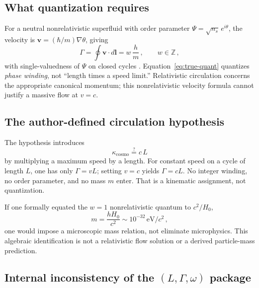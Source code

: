 \documentclass[aps,prd,reprint,superscriptaddress,nofootinbib,floatfix,showkeys]{revtex4-2}
\newcommand{\Hzero}{H_{0}}
\begin{document}
\subsection{What quantization requires}

For a neutral nonrelativistic superfluid with order parameter
\(\Psi=\sqrt{n_s}\,e^{i\theta}\), the velocity is
\(\mathbf v=(\hbar/m)\nabla\theta\), giving
\begin{equation}
  \Gamma = \oint \mathbf{v}\cdot d\mathbf{l}
  = w\,\frac{h}{m}\,,
  \qquad w\in\mathbb{Z}\,,
  \label{eq:true-quant}
\end{equation}
with single-valuedness of \(\Psi\) on closed cycles
\cite{onsager,feynman,volovik}.  Equation~\eqref{eq:true-quant} quantizes
\emph{phase winding}, not ``length times a speed limit.''
Relativistic circulation concerns the appropriate canonical momentum; this
nonrelativistic velocity formula cannot justify a massive flow at \(v=c\).

\subsection{The author-defined circulation hypothesis}

The hypothesis introduces
\begin{equation}
  \kappa_{\mathrm{cosmo}} \stackrel{?}{=} c\,L
  \label{eq:fake-kappa}
\end{equation}
by multiplying a maximum speed by a length.  For constant speed on a cycle of
length \(L\), one has only \(\Gamma=vL\); setting \(v=c\) yields \(\Gamma=cL\).
No integer winding, no order parameter, and no mass \(m\) enter.  That is a
kinematic assignment, not quantization.

If one formally equated the \(w=1\) nonrelativistic quantum to \(c^{2}/\Hzero\),
\begin{equation}
  m = \frac{h\Hzero}{c^{2}}
  \sim 10^{-32}\,\mathrm{eV}/c^{2}\,,
  \label{eq:mass-pred}
\end{equation}
one would impose a microscopic mass relation, not eliminate microphysics.
This algebraic identification is not a relativistic flow solution or a
derived particle-mass prediction.

\subsection{Internal inconsistency of the \texorpdfstring{\((L,\Gamma,\omega)\)}{(L, Gamma, omega)} package}
\end{document}

